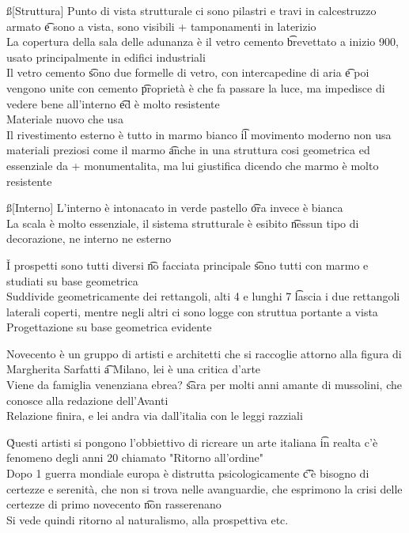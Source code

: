 \documentclass[12pt]{article}
\begin{document}
\ss[Struttura]
Punto di vista strutturale ci sono pilastri e travi in calcestruzzo armato \t e sono a vista, sono visibili + tamponamenti in laterizio \\
La copertura della sala delle adunanza è il vetro cemento \t brevettato a inizio 900, usato principalmente in edifici industriali \\
Il vetro cemento \t sono due formelle di vetro, con intercapedine di aria \t e poi vengono unite con cemento \t proprietà è che fa passare la luce, ma impedisce di vedere bene all'interno \t ed è molto resistente \\
Materiale nuovo che usa \\
Il rivestimento esterno è tutto in marmo bianco \t il movimento moderno non usa materiali preziosi come il marmo \t anche in una struttura cosi geometrica ed essenziale da + monumentalita, ma lui giustifica dicendo che marmo è molto resistente \

\ss[Interno]
L'interno è intonacato in verde pastello \t ora invece è bianca \\
La scala è molto essenziale, il sistema strutturale è esibito \t nessun tipo di decorazione, ne interno ne esterno

\v

I prospetti sono tutti diversi \t no facciata principale \t sono tutti con marmo e studiati su base geometrica \\
Suddivide geometricamente dei rettangoli, alti 4 e lunghi 7 \t lascia i due rettangoli laterali coperti, mentre negli altri ci sono logge con struttua portante a vista \\
Progettazione su base geometrica evidente

\s[Novecento]
Novecento è un gruppo di artisti e architetti che si raccoglie attorno alla figura di Margherita Sarfatti \t a Milano, lei è una critica d'arte \\
Viene da famiglia venenziana ebrea? \t sara per molti anni amante di mussolini, che conosce alla redazione dell'Avanti \\
Relazione finira, e lei andra via dall'italia con le leggi razziali

\v

Questi artisti si pongono l'obbiettivo di ricreare un arte italiana \t in realta c'è fenomeno degli anni 20 chiamato "Ritorno all'ordine" \\
Dopo 1 guerra mondiale europa è distrutta psicologicamente \t c'è bisogno di certezze e serenità, che non si trova nelle avanguardie, che esprimono la crisi delle certezze di primo novecento \t non rasserenano \\
Si vede quindi ritorno al naturalismo, alla prospettiva etc.
\end{document}
